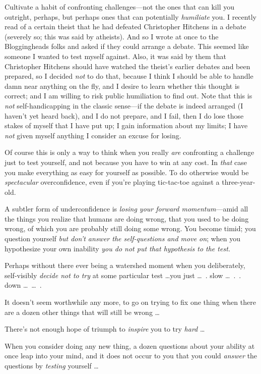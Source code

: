 {
 Cultivate a habit of confronting challenges---not the ones that
can kill you outright, perhaps, but perhaps ones that can potentially
\textit{humiliate} you. I recently read of a certain theist that he had
defeated Christopher Hitchens in a debate (severely so; this was said
by atheists). And so I wrote at once to the Bloggingheads folks and
asked if they could arrange a debate. This seemed like someone I wanted
to test myself against. Also, it was said by them that Christopher
Hitchens should have watched the theist's earlier
debates and been prepared, so I decided \textit{not} to do that,
because I think I should be able to handle damn near anything on the
fly, and I desire to learn whether this thought is correct; and I am
willing to risk public humiliation to find out. Note that this is
\textit{not} self-handicapping in the classic sense---if the debate is
indeed arranged (I haven't yet heard back), and I do
not prepare, and I fail, then I do lose those stakes of myself that I
have put up; I gain information about my limits; I have \textit{not}
given myself anything I consider an excuse for losing.}

{
 Of course this is only a way to think when you really \textit{are}
confronting a challenge just to test yourself, and not because you have
to win at any cost. In \textit{that} case you make everything as easy
for yourself as possible. To do otherwise would be \textit{spectacular}
overconfidence, even if you're playing tic-tac-toe
against a three-year-old.}

{
 A subtler form of underconfidence is \textit{losing your forward
momentum}{}---amid all the things you realize that humans are doing
wrong, that you used to be doing wrong, of which you are probably still
doing some wrong. You become timid; you question yourself \textit{but
don't answer the self-questions and move on}; when you
hypothesize your own inability \textit{you do not put that hypothesis
to the test.}}

{
 Perhaps without there ever being a watershed moment when you
deliberately, self-visibly \textit{decide not to try} at some
particular test \ldots you just \ldots~. slow \ldots~.~. down
\ldots~\ldots~.}

{
 It doesn't seem worthwhile any more, to go on
trying to fix one thing when there are a dozen other things that will
still be wrong \ldots}

{
 There's not enough hope of triumph to
\textit{inspire} you to try \textit{hard} \ldots}

{
 When you consider doing any new thing, a dozen questions about
your ability at once leap into your mind, and it does not occur to you
that you could \textit{answer} the questions by \textit{testing}
yourself \ldots}

